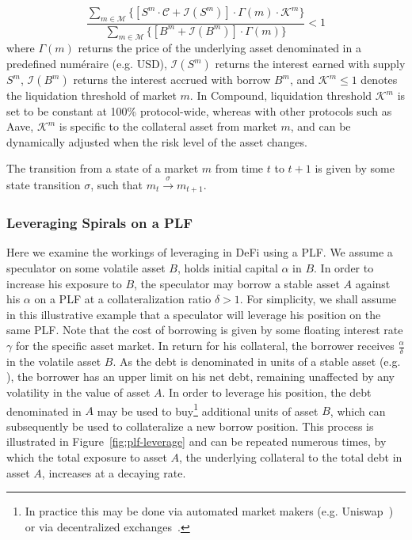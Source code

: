 \begin{equation}
    \frac{\sum_{m\in \mathcal{M}}
    \Big\{\left[S^{m} \cdot \mathcal{C} + \mathcal{I}(S^m)\right] \cdot \Gamma(m) \cdot \mathcal{K}^m \Big\}
    }{
    \sum_{m\in \mathcal{M}} \Big\{\left[B^m + \mathcal{I}(B^m)\right] \cdot \Gamma(m)\Big\}}
    < 1
    \label{eq:liqcond}
\end{equation}
where $\Gamma(m)$ returns the price of the underlying asset denominated in a predefined numéraire (e.g. USD), $\mathcal{I}(S^m)$ returns the interest earned with supply $S^m$, $\mathcal{I}(B^m)$ returns the interest accrued with borrow $B^m$, and $\mathcal{K}^m \leq 1$ denotes the liquidation threshold of market $m$. In Compound, liquidation threshold $\mathcal{K}^m$ is set to be constant at 100\% protocol-wide, whereas with other protocols such as Aave, $\mathcal{K}^m$ is specific to the collateral asset from market $m$, and can be dynamically adjusted when the risk level of the asset changes. 


The transition from a state of a market $m$ from time $t$ to $t+1$ is given by some state transition $\sigma$, such that $m_{t}\xrightarrow[]{\sigma}m_{t+1}$. 

\subsubsection{Leveraging Spirals on a PLF}
\label{ssec:leveraging-spirals-meth}
Here we examine the workings of leveraging in DeFi using a PLF. 
We assume a speculator on some volatile asset $B$, holds initial capital $\alpha$ in $B$.
In order to increase his exposure to $B$, the speculator may borrow a stable asset $A$ against his $\alpha$ on a PLF at a collateralization ratio $\delta>1$.
For simplicity, we shall assume in this illustrative example that a speculator will leverage his position on the same PLF.
Note that the cost of borrowing is given by some floating interest rate $\gamma$ for the specific asset market.
In return for his collateral, the borrower receives $\frac{\alpha}{\delta}$ in the volatile asset $B$.
As the debt is denominated in units of a stable asset (e.g. ), the borrower has an upper limit on his net debt, remaining unaffected by any volatility in the value of asset $A$.
In order to leverage his position, the debt denominated in $A$ may be used to buy\footnote{In practice this may be done via automated market makers \cite{xu2021dexAmm} (e.g. Uniswap~\cite{whitepaper:uniswap}) or via decentralized exchanges~\cite{web:dydx}.} additional units of asset $B$, which can subsequently be used to collateralize a new borrow position.
This process is illustrated in Figure~\ref{fig:plf-leverage} and can be repeated numerous times, by which the total exposure to asset $A$, the underlying collateral to the total debt in asset $A$, increases at a decaying rate.

